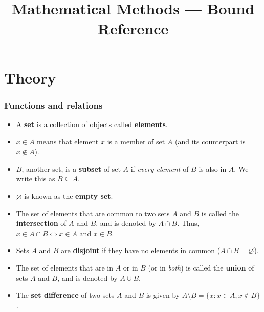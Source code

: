 \documentclass[12pt,a4paper,titlepage]{article}
\title{Mathematical Methods --- Bound Reference}
\begin{document}
    
    
    \maketitle
    
    \tableofcontents
    \pagebreak
    
    
    \part{Theory}
        
        \renewcommand\theHsection{T-\thesection}  %
        
        \section{Functions and relations}
            
            \begin{SummaryBox}[title=Set notation]
                \begin{itemize}[leftmargin=*]
                    \item A \textbf{set} is a collection of objects called \textbf{elements}.
                    \item $x\in A$ means that element $x$ is a member of set $A$ (and its counterpart is $x\notin A$).
                    \item $B$, another set, is a \textbf{subset} of set $A$ if \textit{every element} of $B$ is also in $A$. We write this as $B\subseteq A$.
                    \item $\varnothing$ is known as the \textbf{empty set}.
                    \item The set of elements that are common to two sets $A$ and $B$ is called the \textbf{intersection} of $A$ and $B$, and is denoted by $A\cap B$. Thus, $x\in A\cap B \iff x\in A\text{ and }x\in B$.
                    \item Sets $A$ and $B$ are \textbf{disjoint} if they have no elements in common ($A\cap B=\varnothing$).
                    \item The set of elements that are in $A$ or in $B$ (or in \textit{both}) is called the \textbf{union} of sets $A$ and $B$, and is denoted by $A\cup B$.
                    \item The \textbf{set difference} of two sets $A$ and $B$ is given by $A\setminus B=\{x:x\in A, x\notin B\}$.
                \end{itemize}
            \end{SummaryBox}
            
\end{document}

